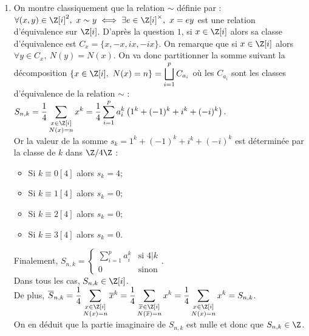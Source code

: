 \documentclass[8pt]{book}
\begin{document}
\begin{enumerate}
\begin{enumerate}[label=\alph*.]
		\end{enumerate}
		\item On montre classiquement que la relation $\sim$ définie par : $\forall (x,y)\in \Z[i]^2,\ x\sim y\iff \exists e\in \Z[i]^\times,\ x=ey$ est une relation d'équivalence sur $\Z[i]$. D'après la question $1$, si $x\in \Z[i]$ alors sa classe d'équivalence est $C_x=\{x,-x,ix,-ix\}$. On remarque que si $x\in \Z[i]$ alors $\forall y\in C_x,\ N(y)=N(x)$. On va donc partitionner la somme suivant la décomposition $\{x\in \Z[i],\ N(x)=n\}=\displaystyle\bigsqcup_{i=1}^pC_{a_i}$ où les $C_{a_i}$ sont les classes d'équivalence de la relation $\sim$ :\\
		$S_{n,k}=\displaystyle\frac{1}{4}\sum_{\substack{x\in \Z[i]\\N(x)=n}}x^k=\frac{1}{4}\sum_{i=1}^pa_i^k\left(1^k+(-1)^k+i^k+(-i)^k\right)$.\\
		Or la valeur de la somme $s_k=1^k+(-1)^k+i^k+(-i)^k$ est déterminée par la classe de $k$ dans $\Z/4\Z$ :
		\begin{itemize}
			\item Si $k\equiv0[4]$ alors $s_k=4$;
			\item Si $k\equiv1[4]$ alors $s_k=0$;
			\item Si $k\equiv2[4]$ alors $s_k=0$;
			\item Si $k\equiv3[4]$ alors $s_k=0$.
		\end{itemize}
		Finalement, $S_{n,k}=
		\begin{cases}
			\displaystyle\sum_{i=1}^pa_i^k&\mbox{si }4|k\\
			0&\mbox{sinon}
		\end{cases}$.\\
		Dans tous les cas, $S_{n,k}\in \Z[i]$.\\
		De plus, $\overline S_{n,k}=\displaystyle\frac{1}{4}\sum_{\substack{x\in \Z[i]\\N(x)=n}}\overline x^k=\frac{1}{4}\sum_{\substack{\overline x\in \Z[i]\\N(\overline x)=n}}x^k=\frac{1}{4}\sum_{\substack{x\in \Z[i]\\N(x)=n}}x^k=S_{n,k}$.\\
		On en déduit que la partie imaginaire de $S_{n,k}$ est nulle et donc que $S_{n,k}\in \Z$.
	\end{enumerate}
	
\end{document}
